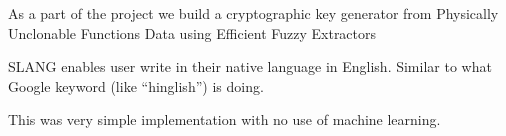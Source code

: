 \begin{tightemize}
	\item As a part of the project we build a cryptographic key generator from Physically Unclonable Functions Data using Efficient Fuzzy Extractors
\end{tightemize}
\sectionsep

\skiplocation
\begin{tightemize}
	\item SLANG enables user write in their native language in English. Similar to what Google keyword (like “hinglish”) is doing.
	\item This was very simple implementation with no use of machine learning.
\end{tightemize}
\sectionsep


\sectionsep